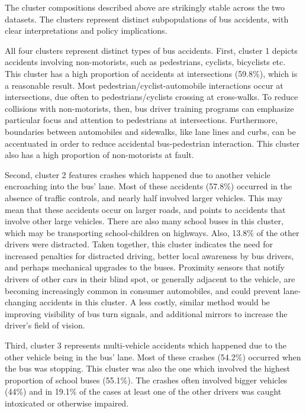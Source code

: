 
The cluster compositions described above are strikingly stable across
the two datasets. The clusters represent distinct subpopulations of
bus accidents, with clear interpretations and policy implications.

All four clusters represent distinct types of bus accidents. First,
cluster 1 depicts accidents involving non-motorists, such as
pedestrians, cyclists, bicyclists etc. This cluster has a high proportion of accidents at
intersections (59.8\%), which is a reasonable result. Most
pedestrian/cyclist-automobile interactions occur at intersections, due often
to pedestrians/cyclists crossing at cross-walks. To reduce collisions with
non-motorists, then, bus driver training programs can emphasize
particular focus and attention to pedestrians at
intersections. Furthermore, boundaries between automobiles and
sidewalks, like lane lines and curbs, can be accentuated in order to
reduce accidental bus-pedestrian interaction. This cluster also has a high proportion of non-motorists at fault. 

Second, cluster 2 features crashes which happened due to another vehicle encroaching into the bus' lane. Most of
these accidents (57.8\%) occurred in the absence of traffic controls,
and nearly half involved larger vehicles. This may mean that 
these accidents occur on larger roads, and points to accidents that
involve other large vehicles. There are also many school buses in this
cluster, which may be transporting school-children on highways. Also,
13.8\%  of the other drivers were distracted. Taken together, this
cluster indicates the need for increased penalties for distracted
driving, better local awareness by bus drivers, and perhaps mechanical
upgrades to the buses. Proximity sensors that notify drivers of other
cars in their blind spot, or generally adjacent to the vehicle, are
becoming increasingly common in consumer automobiles, and could
prevent lane-changing accidents in this cluster. A less costly,
similar method would be improving visibility of bus turn signals, and
additional mirrors to increase the driver's field of vision.

Third, cluster 3 represents multi-vehicle accidents which happened due to the other vehicle being in the bus' lane. Most of these crashes (54.2\%) occurred when the bus was stopping. This cluster was also the one which involved the highest proportion of school buses (55.1\%). The crashes often involved bigger vehicles (44\%) and in 19.1\% of the cases at least one of the other drivers was caught intoxicated or otherwise impaired. 

